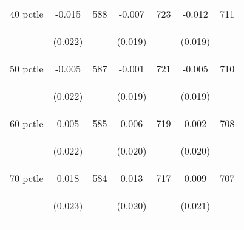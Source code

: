 \begin{tabular}{lcccccc}
40 pctle   &  -0.015   &  588  &   -0.007  &  723 &  -0.012  &  711   \\

\vspace{4pt} &  \begin{footnotesize}(0.022)\end{footnotesize}   & &
			    \begin{footnotesize}(0.019)\end{footnotesize}   & &
			    \begin{footnotesize}(0.019)\end{footnotesize}   &
			     \\          

50 pctle   &  -0.005   &  587  &   -0.001  &  721 &  -0.005  &  710   \\

\vspace{4pt} &  \begin{footnotesize}(0.022)\end{footnotesize}   & &
			    \begin{footnotesize}(0.019)\end{footnotesize}   & &
			    \begin{footnotesize}(0.019)\end{footnotesize}   &
			     \\          

60 pctle   &  0.005   &  585  &   0.006  &  719 &  0.002  &  708   \\


\vspace{4pt} &  \begin{footnotesize}(0.022)\end{footnotesize}   & &
			    \begin{footnotesize}(0.020)\end{footnotesize}   & &
			    \begin{footnotesize}(0.020)\end{footnotesize}   &
			     \\          

70 pctle   &  0.018   &  584  &   0.013  &  717 &  0.009  &  707   \\

\vspace{4pt} &  \begin{footnotesize}(0.023)\end{footnotesize}   & &
			    \begin{footnotesize}(0.020)\end{footnotesize}   & &
			    \begin{footnotesize}(0.021)\end{footnotesize}   &
			     \\          


\end{tabular}
